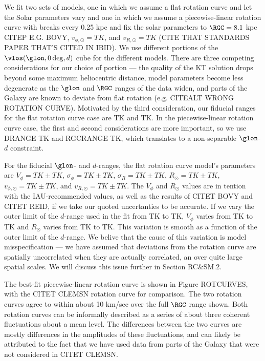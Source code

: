 We fit two sets of models, one in which we assume a flat rotation curve and let the Solar parameters vary and one in which we assume a piecewise-linear rotation curve with breaks every 0.25 kpc and fix the solar parameters to $\RGC=8.1$ kpc CITEP E.G. BOVY, $v_{\phi, \odot}=TK$, and $v_{R, \odot}=TK$ (CITE THAT STANDARDS PAPER THAT'S CITED IN IBID).
We use different portions of the $\vlos(\glon, 0\deg, d)$ cube for the different models. 
There are three competing considerations for our choice of portion --- the quality of the KT solution drops beyond some maximum heliocentric distance, model parameters become less degenerate as the $\glon$ and $\RGC$ ranges of the data widen, and parts of the Galaxy are known to deviate from flat rotation (e.g. CITEALT WRONG ROTATION CURVE). 
Motivated by the third consideration, our fiducial ranges for the flat rotation curve case are TK and TK. 
In the piecewise-linear rotation curve case, the first and second considerations are more important, so we use DRANGE TK and RGCRANGE TK, which translates to a non-separable $\glon$-$d$ constraint.

For the fiducial $\glon$- and $d$-ranges, the flat rotation curve model's parameters are $V_\phi=TK \pm TK$, $\sigma_\phi = TK \pm TK$, $\sigma_R = TK \pm TK$, $R_\odot = TK \pm TK$, $v_{\phi, \odot} = TK \pm TK$, and $v_{R, \odot} = TK \pm TK$.
The $V_\phi$ and $R_{\odot}$ values are in tention with the IAU-recommended values, as well as the results of CITET BOVY and CITET REID, if we take our quoted uncertanties to be accurate. 
If we vary the outer limit of the $d$-range used in the fit from TK to TK, $V_\phi$ varies from TK to TK and $R_\odot$ varies from TK to TK. 
This variation is smooth as a function of the outer limit of the $d$-range.
We belive that the cause of this variation is model misspecification --- we have assumed that deviations from the rotation curve are spatially uncorrelated when they are actually correlated, an over quite large spatial scales. 
We will discuss this issue further in Section RC&SM.2.

The best-fit piecewise-linear rotation curve is shown in Figure ROTCURVES, with the CITET CLEMSN rotation curve for comparison. 
The two rotation curves agree to within about 10 km/sec over the full $\RGC$ range shown.
Both rotation curves can be informally described as a series of about three coherent fluctuations about a mean level. 
The differences between the two curves are mostly differences in the amplitudes of these fluctuations, and can likely be attributed to the fact that we have used data from parts of the Galaxy that were not considered in CITET CLEMSN. 

